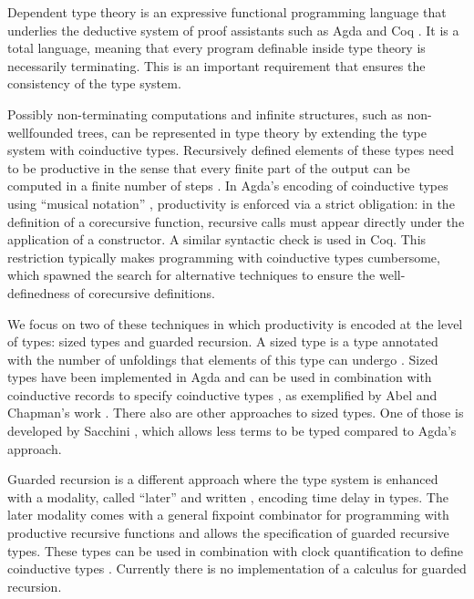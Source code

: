 Dependent type theory is an expressive functional programming
language that underlies the deductive system of proof assistants such
as Agda \cite{norell} and Coq \cite{barras1997coq}. It is a total language,
meaning that every program definable inside type theory is necessarily
terminating. This is an important requirement that ensures the
consistency of the type system. 

Possibly non-terminating computations
and infinite structures, such as non-wellfounded trees, can be
represented in type theory by extending the type system with
coinductive types. Recursively defined elements of these types
need to be productive in the sense that every
finite part of the output can be computed in a finite number of steps \cite{Coquand93}.
In Agda's encoding of coinductive types using ``musical notation''
\cite{DA10}, productivity is enforced via a strict obligation: in the
definition of a corecursive function, recursive
calls must appear directly under
the application of a constructor. A similar syntactic
check is used in Coq. %
This restriction
typically makes programming with coinductive types cumbersome,
which spawned the search for alternative techniques to ensure the
well-definedness of corecursive definitions.

We focus on two of these techniques in which productivity is encoded
at the level of types: sized types and guarded recursion. A sized type
 is a type annotated with the number of unfoldings that
elements of this type can undergo \cite{Hughes96}. Sized types have been implemented
in Agda and can be used in
combination with coinductive records to specify
coinductive types \cite{Copatterns,AVW-normalization}, as exemplified
by Abel and Chapman's work \cite{AC14}.
There also are other approaches to sized types.
One of those is developed by Sacchini \cite{Sacchini13}, which allows less terms to be typed
compared to Agda's approach.

Guarded recursion \cite{Nakano}
is a different approach where the type system is enhanced with a
modality, called ``later'' and written , encoding time delay in
types. The later modality comes with a general fixpoint combinator for
programming with productive recursive functions and allows the
specification of guarded recursive types.
These types can be used in combination with clock quantification to define  coinductive types \cite{atkey2013productive,BahrGM17,bizjak2016guarded}. Currently there is no
implementation of a calculus for guarded recursion.

